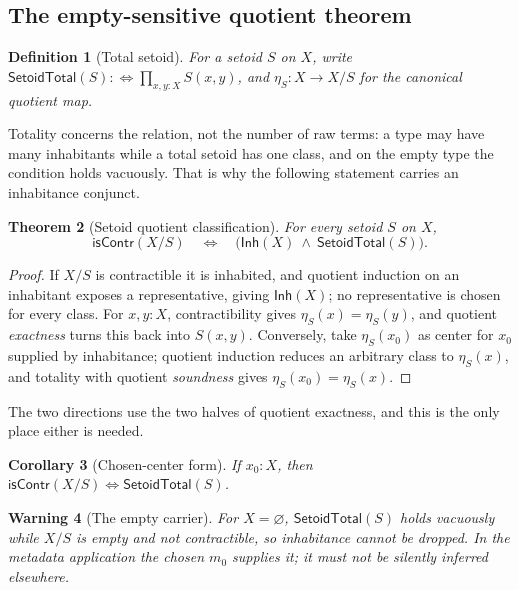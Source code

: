 \documentclass[10pt,reqno]{amsart}
\newtheorem{theorem}{Theorem}[section]
\newtheorem{corollary}[theorem]{Corollary}
\newtheorem{definition}[theorem]{Definition}
\newtheorem{warning}[theorem]{Warning}
\newcommand{\isContr}{\mathsf{isContr}}
\newcommand{\SetTot}{\mathsf{SetoidTotal}}
\begin{document}
\subsection{The empty-sensitive quotient theorem}

\begin{definition}[Total setoid]
\label{def:setoid-total}
For a setoid \(S\) on \(X\), write
\(\SetTot(S):\Longleftrightarrow\prod_{x,y:X}S(x,y)\), and \(\eta_S:X\to X/S\)
for the canonical quotient map.
\end{definition}

Totality concerns the relation, not the number of raw terms: a type may have
many inhabitants while a total setoid has one class, and on the empty type the
condition holds vacuously.  That is why the following statement carries an
inhabitance conjunct.

\begin{theorem}[Setoid quotient classification]
\label{thm:quotient-contractible}
For every setoid \(S\) on \(X\),
\[
 \isContr(X/S)
 \quad\Longleftrightarrow\quad
 \bigl(\mathsf{Inh}(X)\ \wedge\ \SetTot(S)\bigr).
\tag{5.1}\label{eq:quotient-contractible}
\]
\end{theorem}

\begin{proof}
If \(X/S\) is contractible it is inhabited, and quotient induction on an
inhabitant exposes a representative, giving \(\mathsf{Inh}(X)\); no
representative is chosen for every class.  For \(x,y:X\), contractibility gives
\(\eta_S(x)=\eta_S(y)\), and quotient \emph{exactness} turns this back into
\(S(x,y)\).  Conversely, take \(\eta_S(x_0)\) as center for \(x_0\) supplied by
inhabitance; quotient induction reduces an arbitrary class to \(\eta_S(x)\), and
totality with quotient \emph{soundness} gives \(\eta_S(x_0)=\eta_S(x)\).
\end{proof}

The two directions use the two halves of quotient exactness, and this is the
only place either is needed.

\begin{corollary}[Chosen-center form]
\label{cor:quotient-total}
If \(x_0:X\), then \(\isContr(X/S)\Longleftrightarrow\SetTot(S)\).
\end{corollary}

\begin{warning}[The empty carrier]
\label{warn:empty-carrier}
For \(X=\varnothing\), \(\SetTot(S)\) holds vacuously while \(X/S\) is empty and
not contractible, so inhabitance cannot be dropped.  In the metadata application
the chosen \(m_0\) supplies it; it must not be silently inferred elsewhere.
\end{warning}
\end{document}

